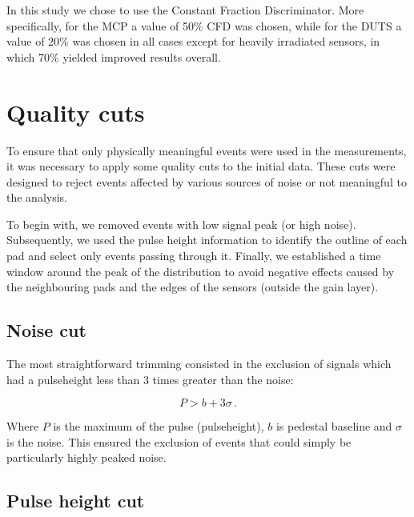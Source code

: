In this study we chose to use the Constant Fraction Discriminator. More specifically, for the MCP a value of 50\% CFD was chosen, while for the DUTS a value of 20\% was chosen in all cases except for heavily irradiated sensors, in which 70\% yielded improved results overall.

\FloatBarrier

\section{Quality cuts}\label{sec:qualtiy_cuts}

To ensure that only physically meaningful events were used in the measurements, it was necessary to apply some quality cuts to the initial data. These cuts were designed to reject events affected by various sources of noise or not meaningful to the analysis. 

To begin with, we removed events with low signal peak (or high noise). Subsequently, we used the pulse height information to identify the outline of each pad and select only events passing through it. Finally, we established a time window around the peak of the distribution to avoid negative effects caused by the neighbouring pads and the edges of the sensors (outside the gain layer).

\subsection{Noise cut}\label{subsec:noise_cut}
The most straightforward trimming consisted in the exclusion of signals which had a pulseheight less than 3 times greater than the noise:

\begin{equation*}
    P > b + 3\sigma \, .
\end{equation*}

Where \(P\) is the maximum of the pulse (pulseheight), \(b\) is pedestal baseline and \(\sigma\) is the noise. This ensured the exclusion of events that could simply be particularly highly peaked noise. %

\subsection{Pulse height cut}\label{subsec:pulseHeight_cut}

